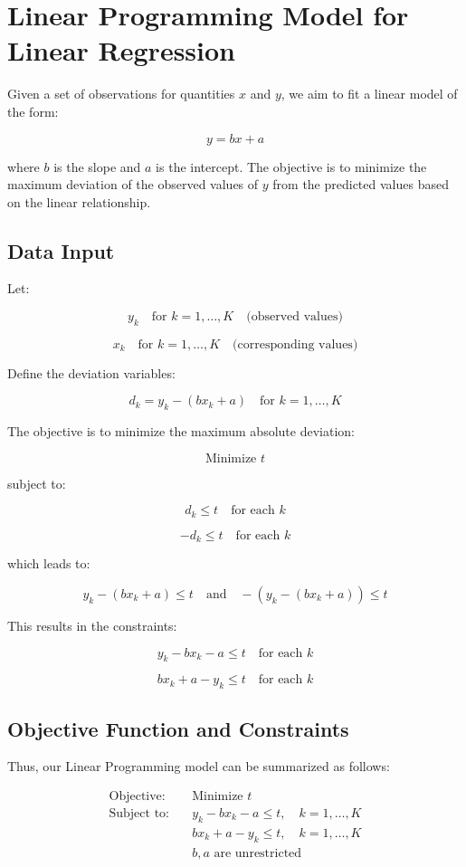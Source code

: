 \documentclass{article}
\begin{document}
\section*{Linear Programming Model for Linear Regression}

Given a set of observations for quantities \( x \) and \( y \), we aim to fit a linear model of the form:

\[
y = bx + a
\]

where \( b \) is the slope and \( a \) is the intercept. The objective is to minimize the maximum deviation of the observed values of \( y \) from the predicted values based on the linear relationship.

\subsection*{Data Input}

Let:

\[
y_k \quad \text{for } k = 1, \ldots, K \quad \text{(observed values)}
\]

\[
x_k \quad \text{for } k = 1, \ldots, K \quad \text{(corresponding values)}
\]

Define the deviation variables:

\[
d_k = y_k - (bx_k + a) \quad \text{for } k = 1, \ldots, K
\]

The objective is to minimize the maximum absolute deviation:

\[
\text{Minimize } t
\]

subject to:

\[
d_k \leq t \quad \text{for each } k
\]

\[
-d_k \leq t \quad \text{for each } k
\]

which leads to:

\[
y_k - (bx_k + a) \leq t \quad \text{and} \quad -(y_k - (bx_k + a)) \leq t
\]

This results in the constraints:

\[
y_k - bx_k - a \leq t \quad \text{for each } k
\]

\[
bx_k + a - y_k \leq t \quad \text{for each } k
\]

\subsection*{Objective Function and Constraints}

Thus, our Linear Programming model can be summarized as follows:

\[
\begin{align*}
\text{Objective:} \quad & \text{Minimize } t \\
\text{Subject to:} \quad & y_k - bx_k - a \leq t, \quad k = 1, \ldots, K \\
& bx_k + a - y_k \leq t, \quad k = 1, \ldots, K \\
& b, a \text{ are unrestricted}
\end{align*}
\]
\end{document}
